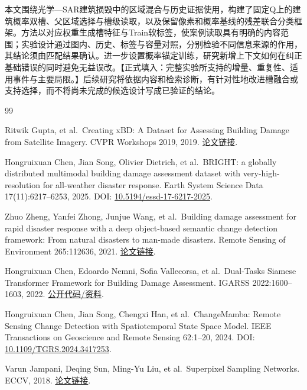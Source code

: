 \documentclass[UTF8,a4paper,zihao=-4,fontset=none]{ctexart}
\begin{document}
本文围绕光学—SAR建筑损毁中的区域混合与历史证据使用，构建了固定Q上的建筑概率双槽、父区域选择与槽级读取，以及保留像素和概率基线的残差联合分类框架。方法以对应权重生成槽特征与Train软标签，使案例读取具有明确的内容范围；实验设计通过图内、历史、标签与容量对照，分别检验不同信息来源的作用，其结论须由匹配结果确认。进一步设置概率锚定训练，研究新增上下文如何在纠正基础错误的同时避免无益误改。【正式填入：完整实验所支持的增量、重复性、适用事件与主要局限。】后续研究将依据内容和检索诊断，有针对性地改进槽融合或支持选择，而不将尚未完成的候选设计写成已验证的结论。
\FloatBarrier
\begin{thebibliography}{99}
\small\setlength{\itemsep}{0.4em}

Ritwik Gupta, et al.~Creating xBD: A Dataset for Assessing Building Damage from Satellite Imagery. CVPR Workshops 2019, 2019. \href{https://openaccess.thecvf.com/content_CVPRW_2019/papers/cv4gc/Gupta_Creating_xBD_A_Dataset_for_Assessing_Building_Damage_from_Satellite_CVPRW_2019_paper.pdf}{论文链接}.

Hongruixuan Chen, Jian Song, Olivier Dietrich, et al.~BRIGHT: a globally distributed multimodal building damage assessment dataset with very-high-resolution for all-weather disaster response. Earth System Science Data 17(11):6217--6253, 2025. DOI: \href{https://doi.org/10.5194/essd-17-6217-2025}{10.5194/essd-17-6217-2025}.

Zhuo Zheng, Yanfei Zhong, Junjue Wang, et al.~Building damage assessment for rapid disaster response with a deep object-based semantic change detection framework: From natural disasters to man-made disasters. Remote Sensing of Environment 265:112636, 2021. \href{https://www.sciencedirect.com/science/article/pii/S0034425721003564}{论文链接}.

Hongruixuan Chen, Edoardo Nemni, Sofia Vallecorsa, et al.~Dual-Tasks Siamese Transformer Framework for Building Damage Assessment. IGARSS 2022:1600--1603, 2022. \href{https://github.com/ChenHongruixuan/BRIGHT/blob/master/bda_benchmark/model/DamageFormer.py}{公开代码/资料}.

Hongruixuan Chen, Jian Song, Chengxi Han, et al.~ChangeMamba: Remote Sensing Change Detection with Spatiotemporal State Space Model. IEEE Transactions on Geoscience and Remote Sensing 62:1--20, 2024. DOI: \href{https://doi.org/10.1109/TGRS.2024.3417253}{10.1109/TGRS.2024.3417253}.

Varun Jampani, Deqing Sun, Ming-Yu Liu, et al.~Superpixel Sampling Networks. ECCV, 2018. \href{https://varunjampani.github.io/ssn/}{论文链接}.


\end{thebibliography}
\end{document}
